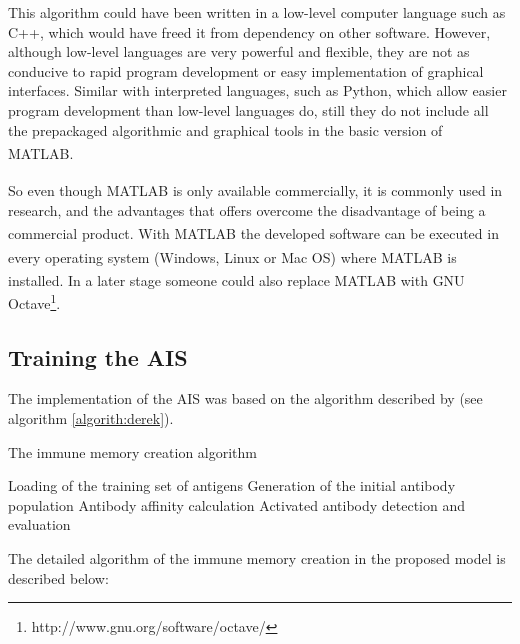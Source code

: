 \documentclass{assignment}
\begin{document}
This algorithm could have been written in a low-level computer language such as C++, which would have freed it from dependency on other software. However, although low-level languages are very powerful and flexible, they are not as conducive to rapid program development or easy implementation of graphical interfaces. Similar with interpreted languages, such as Python, which allow easier program development than low-level languages do, still they do not include all the prepackaged algorithmic and graphical tools in the basic version of MATLAB\textsuperscript{\textregistered}. 

So even though MATLAB\textsuperscript{\textregistered} is only available commercially, it is commonly used in research, and the advantages that offers overcome the disadvantage of being a commercial product. With MATLAB\textsuperscript{\textregistered} the developed software can be executed in every operating system (Windows, Linux or Mac OS) where MATLAB\textsuperscript{\textregistered} is installed. In a later stage someone could also replace MATLAB\textsuperscript{\textregistered} with GNU Octave\footnote{http://www.gnu.org/software/octave/}.

\subsection{Training the AIS}

The implementation of the AIS was based on the algorithm described by \textcite{AIS_STLF08} (see algorithm \ref{algorith:derek}). 

\begin{algorithm}                        %
\caption{The immune memory creation algorithm \cite{AIS_STLF08}}          %
\label{algorith:derek}                      %
Loading of the training set of antigens \; 
Generation of the initial antibody population \;
Antibody affinity calculation \;
Activated antibody detection and evaluation \;
\end{algorithm}

The detailed algorithm of the immune memory creation in the proposed model is described below:
\end{document}
